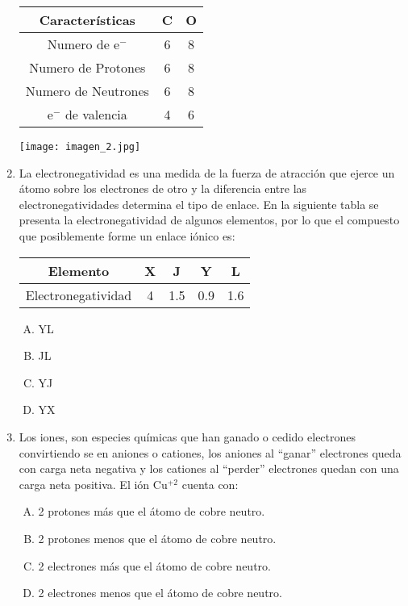 \begin{enumerate}
\begin{center}
\begin{tabular}{|ccc|}
\hline 
Características & C & O \\  
\hline 
Numero de e$^-$ & 6 & 8 \\ 
Numero de Protones & 6 & 8 \\ 
Numero de Neutrones & 6 & 8 \\ 
e$^-$ de valencia & 4 & 6 \\ 
\hline 
\end{tabular} 
\end{center}

\texttt{[image: imagen\_2.jpg]}
\justifying


\item La electronegatividad es una medida de la fuerza de atracción que ejerce un átomo sobre los electrones de otro y la diferencia entre las electronegatividades determina el tipo de enlace.  
En la siguiente tabla se presenta la electronegatividad de algunos elementos, por lo que el compuesto que posiblemente forme un enlace iónico es: \label{mon-4}


\begin{center}
\begin{tabular}{|ccccc|}
\hline 
Elemento & X & J & Y & L \\ 
\hline 
Electronegatividad & 4 & 1.5 & 0.9 & 1.6 \\ 
\hline 
\end{tabular} 
\end{center}
\begin{enumerate}[(A)]
\item YL
\item JL
\item YJ
\item YX
\end{enumerate}

\newpage
\item Los iones, son especies químicas que han ganado o cedido electrones convirtiendo se en aniones o cationes, los aniones al ``ganar'' electrones queda con carga neta negativa y los cationes al ``perder'' electrones quedan con una carga neta positiva. El ión Cu$^{+2}$ cuenta con: \label{mon-5}

\begin{enumerate}[(A)]
\item 2 protones más que el átomo de cobre neutro.
\item 2 protones menos que el átomo de cobre neutro.
\item 2 electrones más que el átomo de cobre neutro.
\item 2 electrones menos que el átomo de cobre neutro.
\end{enumerate}


\end{enumerate}
